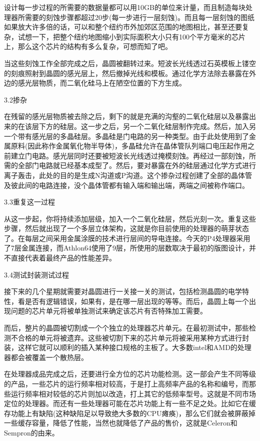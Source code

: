 \documentclass[utf8]{book}
\begin{document}
	设计每一步过程的所需要的数据量都可以用10GB的单位来计量，而且制造每块处理器所需要的刻蚀步骤都超过20步(每一步进行一层刻蚀)。而且每一层刻蚀的图纸如果放大许多倍的话，可以和整个纽约市外加郊区范围的地图相比，甚至还要复杂，试想一下，把整个纽约地图缩小到实际面积大小只有100个平方毫米的芯片上，那么这个芯片的结构有多么复杂，可想而知了吧。
	
	当这些刻蚀工作全部完成之后，晶圆被翻转过来。短波长光线透过石英模板上镂空的刻痕照射到晶圆的感光层上，然后撤掉光线和模板。通过化学方法除去暴露在外边的感光层物质，而二氧化硅马上在陋空位置的下方生成。
	
	3.2掺杂
	
	在残留的感光层物质被去除之后，剩下的就是充满的沟壑的二氧化硅层以及暴露出来的在该层下方的硅层。这一步之后，另一个二氧化硅层制作完成。然后，加入另一个带有感光层的多晶硅层。多晶硅是门电路的另一种类型。由于此处使用到了金属原料(因此称作金属氧化物半导体)，多晶硅允许在晶体管队列端口电压起作用之前建立门电路。感光层同时还要被短波长光线透过掩模刻蚀。再经过一部刻蚀，所需的全部门电路就已经基本成型了。然后，要对暴露在外的硅层通过化学方式进行离子轰击，此处的目的是生成N沟道或P沟道。这个掺杂过程创建了全部的晶体管及彼此间的电路连接，没个晶体管都有输入端和输出端，两端之间被称作端口。
	
	3.3重复这一过程
	
	从这一步起，你将持续添加层级，加入一个二氧化硅层，然后光刻一次。重复这些步骤，然后就出现了一个多层立体架构，这就是你目前使用的处理器的萌芽状态了。在每层之间采用金属涂膜的技术进行层间的导电连接。今天的P4处理器采用了7层金属连接，而Athlon64使用了9层，所使用的层数取决于最初的版图设计，并不直接代表着最终产品的性能差异。
	
	3.4测试封装测试过程
	
	接下来的几个星期就需要对晶圆进行一关接一关的测试，包括检测晶圆的电学特性，看是否有逻辑错误，如果有，是在哪一层出现的等等。而后，晶圆上每一个出现问题的芯片单元将被单独测试来确定该芯片有否特殊加工需要。
	
	而后，整片的晶圆被切割成一个个独立的处理器芯片单元。在最初测试中，那些检测不合格的单元将被遗弃。这些被切割下来的芯片单元将被采用某种方式进行封装，这样它就可以顺利的插入某种接口规格的主板了。大多数intel和AMD的处理器都会被覆盖一个散热层。
	
	在处理器成品完成之后，还要进行全方位的芯片功能检测。这一部会产生不同等级的产品，一些芯片的运行频率相对较高，于是打上高频率产品的名称和编号，而那些运行频率相对较低的芯片则加以改造，打上其它的低频率型号。这就是不同市场定位的处理器。而还有一些处理器可能在芯片功能上有一些不足之处。比如它在缓存功能上有缺陷(这种缺陷足以导致绝大多数的CPU瘫痪)，那么它们就会被屏蔽掉一些缓存容量，降低了性能，当然也就降低了产品的售价，这就是Celeron和Sempron的由来。
	
\end{document}
